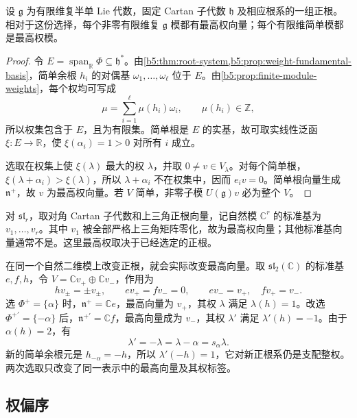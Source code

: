 \begin{proposition}\label{b5:prop:finite-simple-highest}
	设 \(\mathfrak g\) 为有限维复半单 Lie 代数，固定 Cartan 子代数 \(\mathfrak h\) 及相应根系的一组正根。相对于这份选择，每个非零有限维复 \(\mathfrak g\) 模都有最高权向量；每个有限维简单模都是最高权模。
\end{proposition}
\begin{proof}
	令 \(E=\operatorname{span}_{\mathbb R}\Phi\subseteq\mathfrak h^*\)。由\cref{b5:thm:root-system,b5:prop:weight-fundamental-basis}，简单余根 \(h_i\) 的对偶基 \(\omega_1,\ldots,\omega_\ell\) 位于 \(E\)。由\cref{b5:prop:finite-module-weights}，每个权均可写成
	\[
		\mu=\sum_{i=1}^\ell\mu(h_i)\omega_i, \qquad \mu(h_i)\in\mathbb Z,
	\]
	所以权集包含于 \(E\)，且为有限集。简单根是 \(E\) 的实基，故可取实线性泛函 \(\xi:E\to\mathbb R\)，使 \(\xi(\alpha_i)=1>0\) 对所有 \(i\) 成立。

	选取在权集上使 \(\xi(\lambda)\) 最大的权 \(\lambda\)，并取 \(0\ne v\in V_\lambda\)。对每个简单根，\(\xi(\lambda+\alpha_i)>\xi(\lambda)\)，所以 \(\lambda+\alpha_i\) 不在权集中，因而 \(e_iv=0\)。简单根向量生成 \(\mathfrak n^+\)，故 \(v\) 为最高权向量。若 \(V\) 简单，非零子模 \(U(\mathfrak g)v\) 必为整个 \(V\)。
\end{proof}

对 \(\mathfrak{sl}_r\)，取对角 Cartan 子代数和上三角正根向量，记自然模 \(\mathbb C^r\) 的标准基为 \(v_1,\ldots,v_r\)。其中 \(v_1\) 被全部严格上三角矩阵零化，故为最高权向量；其他标准基向量通常不是。这里最高权取决于已经选定的正根。

\ProseParagraphBreak

在同一个自然二维模上改变正根，就会实际改变最高向量。取 \(\mathfrak{sl}_2(\mathbb C)\) 的标准基 \(e,f,h\)，令 \(V=\mathbb Cv_+\oplus\mathbb Cv_-\)，作用为
\[
	hv_\pm=\pm v_\pm,\qquad ev_+=fv_-=0,\qquad ev_-=v_+,\quad fv_+=v_-.
\]
选 \(\Phi^+=\{\alpha\}\) 时，\(\mathfrak n^+=\mathbb Ce\)，最高向量为 \(v_+\)，其权 \(\lambda\) 满足 \(\lambda(h)=1\)。改选 \(\Phi^{+\prime}=\{-\alpha\}\) 后，\(\mathfrak n^{+\prime}=\mathbb Cf\)，最高向量成为 \(v_-\)，其权 \(\lambda'\) 满足 \(\lambda'(h)=-1\)。由于 \(\alpha(h)=2\)，有
\[
	\lambda'=-\lambda=\lambda-\alpha=s_\alpha\lambda.
\]
新的简单余根元是 \(h_{-\alpha}=-h\)，所以 \(\lambda'(-h)=1\)，它对新正根系仍是支配整权。两次选取只改变了同一表示中的最高向量及其权标签。

\subsection{权偏序}
\label{b5:subsec:1802:03}

